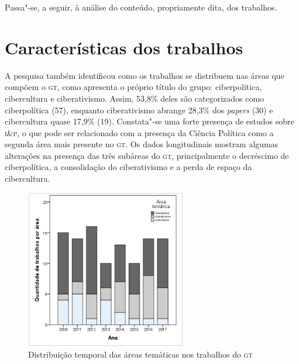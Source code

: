 {

Passa"-se, a seguir, à análise do conteúdo, propriamente dita, dos
trabalhos.

\section{Características dos trabalhos}

A pesquisa também identificou como os trabalhos se distribuem nas áreas
que compõem o \textsc{gt}, como apresenta o próprio título do grupo:
ciberpolítica, cibercultura e ciberativismo. Assim, 53,8\% deles são
categorizados como ciberpolítica (57), enquanto ciberativismo abrange
28,3\% dos \textit{papers} (30) e cibercultura quase 17,9\% (19).
Constata"-se uma forte presença de estudos sobre \textsc{i\&p}, o
que pode ser relacionado com a presença da Ciência Política como a
segunda área mais presente no \textsc{gt}. Os dados longitudinais mostram algumas
alterações na presença das três subáreas do \textsc{gt}, principalmente o
decréscimo de ciberpolítica, a consolidação do ciberativismo e a perda
de espaço da cibercultura.


 \begin{figure}[!ht]
 \centering
  \includegraphics[width=70mm]{./imgs/graf3_5.png}
 \caption{Distribuição temporal das áreas temáticas nos trabalhos do \textsc{gt}\footnotemark}
 \end{figure}

}
